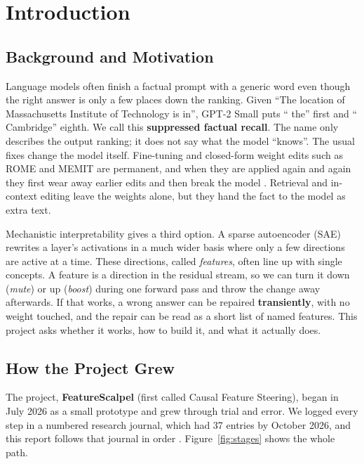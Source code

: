 \chapter{Introduction}\label{ch:introduction}

\section{Background and Motivation}

Language models often finish a factual prompt with a generic word even though the right answer is only a few places down the ranking. Given ``The location of Massachusetts Institute of Technology is in'', GPT-2 Small \cite{r1} puts `` the'' first and `` Cambridge'' eighth. We call this \textbf{suppressed factual recall}. The name only describes the output ranking; it does not say what the model ``knows''. The usual fixes change the model itself. Fine-tuning and closed-form weight edits such as ROME \cite{r2} and MEMIT \cite{r3} are permanent, and when they are applied again and again they first wear away earlier edits and then break the model \cite{r4}. Retrieval and in-context editing \cite{r34,r31} leave the weights alone, but they hand the fact to the model as extra text.

Mechanistic interpretability gives a third option. A sparse autoencoder (SAE) \cite{r6,r7} rewrites a layer's activations in a much wider basis where only a few directions are active at a time. These directions, called \emph{features}, often line up with single concepts. A feature is a direction in the residual stream, so we can turn it down (\emph{mute}) or up (\emph{boost}) during one forward pass and throw the change away afterwards. If that works, a wrong answer can be repaired \textbf{transiently}, with no weight touched, and the repair can be read as a short list of named features. This project asks whether it works, how to build it, and what it actually does.

\section{How the Project Grew}

The project, \textbf{FeatureScalpel} (first called Causal Feature Steering), began in July 2026 as a small prototype and grew through trial and error. We logged every step in a numbered research journal, which had 37 entries by October 2026, and this report follows that journal in order \cite{p1,p17}. Figure~\ref{fig:stages} shows the whole path.

